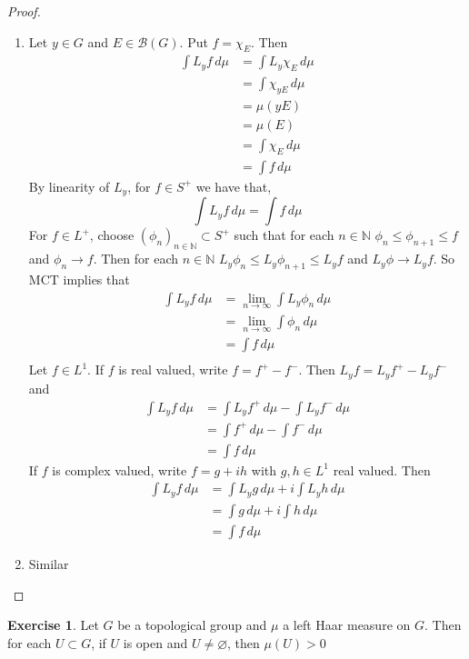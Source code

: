 \documentclass{book}
\theoremstyle{definition}
\newtheorem{ex}[definition]{Exercise}
\newcommand{\N}{\mathbb{N}}
\newcommand{\MB}{\mathcal{B}}
\newcommand{\lex}[1]{\label{ex:#1}}
\DeclareMathOperator*{\0}{\mbf{0}}
\DeclareMathOperator*{\1}{\mbf{1}}
\newcommand{\limn}{\lim \limits_{n \rightarrow \infty}}
\newcommand{\seq}[2]{(#1_{#2})_{#2 \in \N}}
\newcommand{\dmu}{\, d \mu}
\begin{document}
	\begin{proof}\
		\begin{enumerate}
			\item Let $y \in G$ and $E \in \MB(G)$. Put $f = \chi_E$. Then 
			\begin{align*}
				\int L_y f \dmu 
				& = \int L_y\chi_E \dmu \\
				& =  \int \chi_{yE} \dmu \\
				& = \mu(yE) \\
				& = \mu(E) \\
				& = \int \chi_E \dmu \\
				& = \int f \dmu
			\end{align*} 
			By linearity of $L_y$, for $f \in S^+$ we have that, $$\int L_y f \dmu = \int f \dmu$$ For $f \in L^+$, choose $\seq{\phi}{n} \subset S^+$ such that for each $n \in \N$ $\phi_n \leq \phi_{n+1} \leq f$ and $\phi_n \rightarrow f$. Then for each $n \in \N$ $L_y \phi_n \leq L_y \phi_{n+1} \leq L_y f$ and $L_y \phi \rightarrow L_y f$. So MCT implies that 
			\begin{align*}
				\int L_y f \dmu 
				& = \limn \int L_y \phi_n \dmu \\
				& = \limn \int \phi_n \dmu \\
				& = \int f \dmu \\
			\end{align*}
			Let $f \in L^1$. If $f$ is real valued, write $f = f^+ - f^-$. Then $L_y f = L_y f^+ - L_y f^-$ and 
			\begin{align*}
				\int L_yf \dmu 
				& = \int L_y f^+ \dmu - \int L_y f^- \dmu \\
				& = \int f^+ \dmu - \int f^- \dmu \\
				& = \int f \dmu
			\end{align*}
			If $f$ is complex valued, write $f = g + ih$ with $g, h \in L^1$ real valued. Then 
			\begin{align*}
				\int L_yf \dmu 
				& = \int L_y g \dmu + i \int L_y h \dmu \\
				& = \int g \dmu +i \int h \dmu \\
				& = \int f \dmu
			\end{align*}
			\item Similar
		\end{enumerate}
	\end{proof}
	
	\begin{ex} \lex{00000} 
		Let $G$ be a topological group and $\mu$ a left Haar measure on $G$. Then for each $U \subset G$, if $U$ is open and $U \neq \varnothing$, then $\mu(U) > 0$
	\end{ex}
\end{document}
